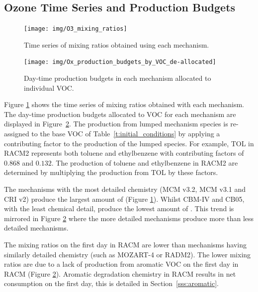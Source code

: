 
\subsection[Ozone Time Series and Ox Production Budgets]{Ozone Time Series and  Production Budgets}

\begin{figure}
    \centering
    \texttt{[image: img/O3\_mixing\_ratios]}
    \vspace{1mm}
    \caption{Time series of  mixing ratios obtained using each mechanism.}
    \vspace{-4mm}
    \label{f:time_series}
\end{figure}

\begin{figure}
    \centering
    \texttt{[image: img/Ox\_production\_budgets\_by\_VOC\_de-allocated]}
    \vspace{1mm}
    \caption{Day-time  production budgets in each mechanism allocated to individual VOC.}
    \vspace{-4mm}
    \label{f:Ox_tagged_budgets}
\end{figure}

Figure \ref{f:time_series} shows the time series of  mixing ratios obtained with each mechanism.
The day-time  production budgets allocated to VOC for each mechanism are displayed in \mbox{Figure \ref{f:Ox_tagged_budgets}}.
The  production from lumped mechanism species is re-assigned to the base VOC of \mbox{Table \ref{t:initial_conditions}} by applying a contributing factor to the  production of the lumped species.
For example, TOL in RACM2 represents both toluene and ethylbenzene with contributing factors of $0.868$ and $0.132$.
The  production of toluene and ethylbenzene in RACM2 are determined by multiplying the  production from TOL by these factors.

The mechanisms with the most detailed chemistry (MCM v3.2, MCM v3.1 and CRI v2) produce the largest amount of  (Figure \ref{f:time_series}).
Whilst CBM-IV and CB05, with the least chemical detail, produce the lowest amount of .
This trend is mirrored in Figure \ref{f:Ox_tagged_budgets} where the more detailed mechanisms produce more  than less detailed mechanisms.

The  mixing ratios on the first day in RACM are lower than mechanisms having similarly detailed chemistry (such as MOZART-4 or RADM2).
The lower  mixing ratios are due to a lack of  production from aromatic VOC on the first day in RACM (Figure \ref{f:Ox_tagged_budgets}).
Aromatic degradation chemistry in RACM results in net  consumption on the first day, this is detailed in \mbox{Section \ref{sss:aromatic}}.

